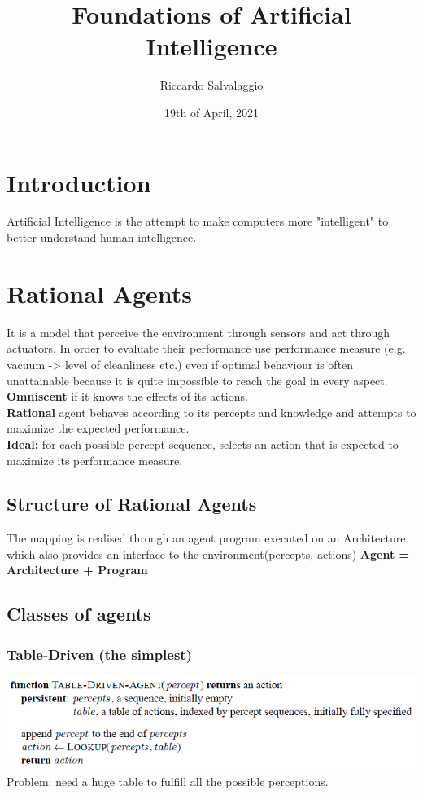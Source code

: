 \documentclass{article}
\title{Foundations of Artificial Intelligence}
\author{Riccardo Salvalaggio}
\date{19th of April, 2021}
\begin{document}
\maketitle
\newpage
\tableofcontents
\newpage

\section{Introduction}
Artificial Intelligence is the attempt to make computers more "intelligent" to better understand human intelligence.
\section{Rational Agents}
It is a model that perceive the environment through sensors and act through actuators. In order to evaluate their performance use performance measure (e.g. vacuum -> level of cleanliness etc.) even if optimal behaviour is often unattainable because it is quite impossible to reach the goal in every aspect.\\ \textbf{Omniscent }if it knows the effects of its actions.\\ \textbf{Rational} agent behaves according to its percepts and knowledge and attempts to maximize the expected performance.\\ \textbf{Ideal: }for each possible percept sequence, selects an action that is expected to maximize its performance measure.
\subsection{Structure of Rational Agents}
The mapping is realised through an agent program executed on an Architecture which also provides an interface to the environment(percepts, actions)
\textbf{Agent = Architecture + Program}
\subsection{Classes of agents}
\subsubsection{Table-Driven (the simplest)}
\includegraphics[scale=0.8]{1.png}\\
Problem: need a huge table to fulfill all the possible perceptions.\\
\end{document}
